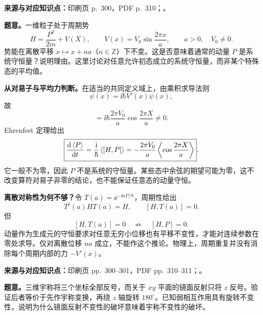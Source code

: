 \textbf{来源与对应知识点：}印刷页 p.~300，PDF p.~310；。

\textbf{题意。}一维粒子处于周期势
\begin{equation}
  H=\frac{P^2}{2m}+V(X),\qquad
  V(x)=V_0\sin\frac{2\pi x}{a},\qquad a>0,\quad V_0\ne0.
\end{equation}
势能在离散平移 $x\mapsto x+na$（$n\in\mathbb Z$）下不变。这是否意味着通常的动量 $P$ 是系统守恒量？说明理由。这里讨论对任意允许初态成立的系统守恒量，而非某个特殊态的平均值。

\begin{checkedsolution}
\textbf{从对易子与平均力判断。}在适当的共同定义域上，由乘积求导法则
\begin{equation}
  [V(X),P]\psi(x)=\ii\hbar V'(x)\psi(x),
\end{equation}
故
\begin{equation}
  [H,P]=\ii\hbar\frac{2\pi V_0}{a}
                     \cos\frac{2\pi X}{a}\ne0.
\end{equation}
Ehrenfest 定理给出
\begin{equation}
  \boxed{\frac{\mathop{}\!\mathrm{d}\left\langle P \right\rangle}{\mathop{}\!\mathrm{d} t}
    =\frac{\mathrm{i}}{\hbar}\left\langle [H,P] \right\rangle
    =-\frac{2\pi V_0}{a}
                 \left\langle \cos\frac{2\pi X}{a} \right\rangle}.
\end{equation}
它一般不为零，因此 $P$ 不是系统的守恒量。某些态中余弦的期望可能为零，这不改变算符对易子非零的结论，也不能保证任意态的动量守恒。

\textbf{离散对称性为何不够？}令 $T(a)=\ee^{-\ii aP/\hbar}$，周期性给出
\begin{equation}
  T^\dagger(a)HT(a)=H,\qquad [H,T(a)]=0.
\end{equation}
但
\begin{equation}
  \boxed{[H,T(a)]=0\quad\not\Rightarrow\quad[H,P]=0}.
\end{equation}
动量作为生成元的守恒要求对任意无穷小位移也有平移不变性，才能对连续参数在零处求导。仅对离散位移 $na$ 成立，不能作这个推论。物理上，周期重复并没有消除每个周期内部的力 $-V'(x)$。
\end{checkedsolution}

\textbf{来源与对应知识点：}印刷页 pp.~300--301，PDF pp.~310--311；。

\textbf{题意。}三维宇称将三个坐标全部反号，而关于 $xy$ 平面的镜面反射只将 $z$ 反号。验证后者等价于先作宇称变换，再绕 $z$ 轴旋转 $180^\circ$。已知弱相互作用具有旋转不变性，说明为什么镜面反射不变性的破坏意味着宇称不变性的破坏。

